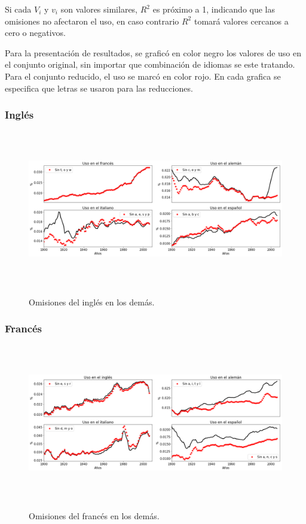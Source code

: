 Si cada $V_{i}$ y $v_{i}$ son valores similares, $R^{2}$ es próximo a 1, indicando que las omisiones no afectaron el uso, en caso contrario $R^{2}$ tomará valores cercanos a cero o negativos. 

Para la presentación de resultados, se graficó en color negro los valores de uso en el conjunto original, sin importar que combinación de idiomas se este tratando.  Para el conjunto reducido, el uso se marcó en color rojo.  En cada grafica se especifica que letras se usaron para las reducciones. 

\newpage

\subsubsection*{Inglés}

\begin{figure}[h!]
	\centering
	\includegraphics[width=14.5cm, height=6.8cm]{Cap_5/OM_EN.png}
	\label{fig.OM_EN}
	\caption{Omisiones del inglés en los demás.}
\end{figure}


\subsubsection*{Francés}

\begin{figure}[h!]
	\centering
	\includegraphics[width=14.5cm, height=6.8cm]{Cap_5/OM_FR.png}
	\label{fig.OM_FR}
	\caption{Omisiones del francés en los demás.}
\end{figure}



